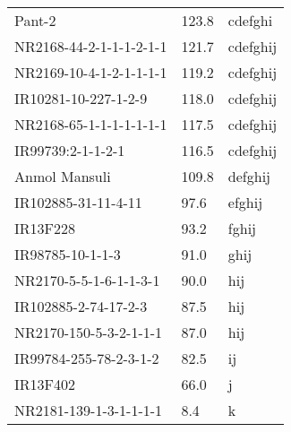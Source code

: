\documentclass[]{article}
\begin{document}
\begin{longtable}{lll}
Pant-2 & 123.8 & cdefghi\\
\rowcolor{gray!6}  NR2168-44-2-1-1-1-2-1-1 & 121.7 & cdefghij\\
NR2169-10-4-1-2-1-1-1-1 & 119.2 & cdefghij\\
\addlinespace
\rowcolor{gray!6}  IR10281-10-227-1-2-9 & 118.0 & cdefghij\\
NR2168-65-1-1-1-1-1-1-1 & 117.5 & cdefghij\\
\rowcolor{gray!6}  IR99739:2-1-1-2-1 & 116.5 & cdefghij\\
Anmol Mansuli & 109.8 & defghij\\
\rowcolor{gray!6}  IR102885-31-11-4-11 & 97.6 & efghij\\
\addlinespace
IR13F228 & 93.2 & fghij\\
\rowcolor{gray!6}  IR98785-10-1-1-3 & 91.0 & ghij\\
NR2170-5-5-1-6-1-1-3-1 & 90.0 & hij\\
\rowcolor{gray!6}  IR102885-2-74-17-2-3 & 87.5 & hij\\
NR2170-150-5-3-2-1-1-1 & 87.0 & hij\\
\addlinespace
\rowcolor{gray!6}  IR99784-255-78-2-3-1-2 & 82.5 & ij\\
IR13F402 & 66.0 & j\\
\rowcolor{gray!6}  NR2181-139-1-3-1-1-1-1 & 8.4 & k\\
\bottomrule
\end{longtable}
\endgroup{}
\begingroup\fontsize{12}{14}\selectfont
\end{document}
